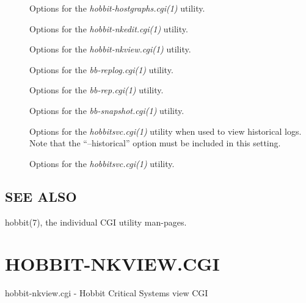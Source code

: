 \begin{description}
 

\item[] Options for the \emph{hobbit-hostgraphs.cgi(1)}
 utility. 

 

\item[] Options for the \emph{hobbit-nkedit.cgi(1)}
 utility. 

 

\item[] Options for the \emph{hobbit-nkview.cgi(1)}
 utility. 

 

\item[] Options for the \emph{bb-replog.cgi(1)}
 utility. 

 

\item[] Options for the \emph{bb-rep.cgi(1)}
 utility. 

 

\item[] Options for the \emph{bb-snapshot.cgi(1)}
 utility. 

 

\item[] Options for the \emph{hobbitsvc.cgi(1)}
 utility when used to view historical logs. Note that the ``--historical'' option must be included in this setting. 

 

\item[] Options for the \emph{hobbitsvc.cgi(1)}
 utility. 

 


\end{description}
\subsection{SEE ALSO}
hobbit(7), the individual CGI utility man-pages. 

%
%
\newpage
\section{HOBBIT-NKVIEW.CGI}

hobbit-nkview.cgi - Hobbit Critical Systems view CGI

